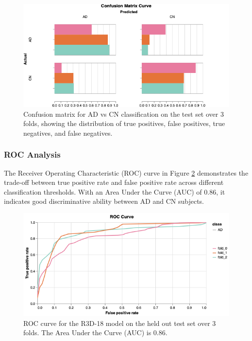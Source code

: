 \documentclass[11pt, a4paper]{article}
\begin{document}
\begin{figure}[htbp]
  \centering
  \includegraphics[width=\textwidth]{figures/CM3F.png}
  \caption{Confusion matrix for AD vs CN classification on the test set over 3 folds, showing the distribution of true positives, false positives, true negatives, and false negatives.}
  \label{fig:confusion_matrix}
\end{figure}

\subsubsection{ROC Analysis}

The Receiver Operating Characteristic (ROC) curve in Figure \ref{fig:roc_curve} demonstrates the trade-off between true positive rate and false positive rate across different classification thresholds. With an Area Under the Curve (AUC) of 0.86, it indicates good discriminative ability between AD and CN subjects.

\begin{figure}[htbp]
  \centering
  \includegraphics[width=\textwidth]{figures/ROC3F.png}
  \caption{ROC curve for the R3D-18 model on the held out test set over 3 folds. The Area Under the Curve (AUC) is 0.86.}
  \label{fig:roc_curve}
\end{figure}
\end{document}

